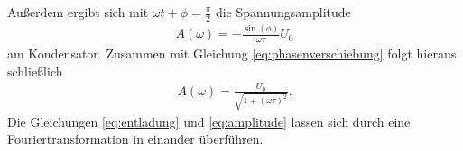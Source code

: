 \noindent
Außerdem ergibt sich mit $\omega t + \phi = \frac{\pi}{2}$ die Spannungsamplitude
\begin{align}
    A(\omega) = - \frac{\sin(\phi)}{\omega \tau} U_0
\end{align}
am Kondensator.
Zusammen mit Gleichung \eqref{eq:phasenverschiebung} folgt hieraus schließlich
\begin{align}
    A(\omega) = \frac{U_0}{\sqrt{1+ (\omega \tau)^2}}.
    \label{eq:amplitude}
\end{align}
Die Gleichungen \eqref{eq:entladung} und \eqref{eq:amplitude} lassen sich durch eine Fouriertransformation in einander überführen.